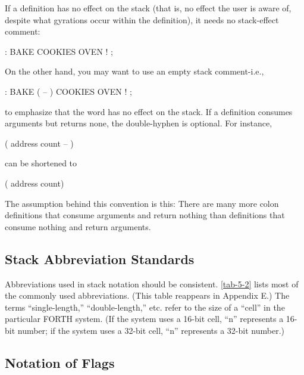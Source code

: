 If a definition has no effect on the stack (that is, no effect the user is
aware of, despite what gyrations occur within the definition), it needs no
stack-effect comment:
\begin{Code}
: BAKE   COOKIES OVEN ! ;
\end{Code}
On the other hand, you may want to use an empty stack comment-i.e.,
\begin{Code}
: BAKE  ( -- )  COOKIES OVEN ! ;
\end{Code}
to emphasize that the word has no effect on the stack.
If a definition consumes arguments but returns none, the double-hyphen
is optional.  For instance,
\begin{Code}
( address count -- )
\end{Code}
can be shortened to
\begin{Code}
( address count)
\end{Code}
The assumption behind this convention is this: There are many more
colon definitions that consume arguments and return nothing than
definitions that consume nothing and return arguments.

\subsection{Stack Abbreviation Standards}

Abbreviations used in stack notation should be consistent.  \ref{tab-5-2} lists
most of the commonly used abbreviations.  (This table reappears in
Appendix E.) The terms ``single-length,'' ``double-length,'' etc. refer to
the size of a ``cell'' in the particular FORTH system.  (If the system uses a
16-bit cell, ``n'' represents a 16-bit number; if the system uses a 32-bit
cell, ``n'' represents a 32-bit number.)

\subsection{Notation of Flags}

